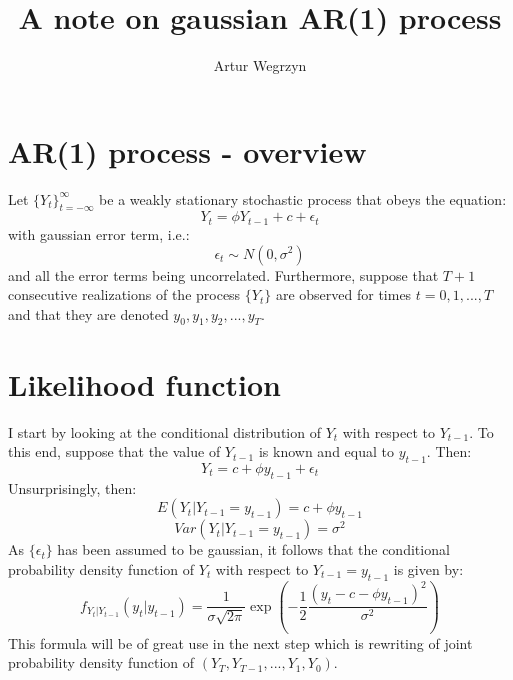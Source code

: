 \documentclass[12pt]{article}
\begin{document}
\title{A note on gaussian AR(1) process}
\author{Artur Wegrzyn}
\maketitle


\tableofcontents

\section{AR(1) process - overview}
Let $\{Y_t\}_{t=-\infty}^{\infty}$ be a weakly stationary stochastic process that obeys
the equation:
\begin{equation}
\label{ar1_def_eqtn}
Y_t = \phi Y_{t-1} + c + \epsilon_t
\end{equation}
with gaussian error term, i.e.:
\begin{equation}
\epsilon_t \sim N(0, \sigma^2)
\end{equation}
and all the error terms being uncorrelated. Furthermore, suppose that $T+1$ consecutive 
realizations of the process $\{Y_t\}$ are observed for times $t = 0, 1, ..., T$ and that
 they are denoted $y_0, y_1, y_2, ..., y_T$. \\
 

\section{Likelihood function}
I start by looking at the conditional distribution of $Y_t$ with respect to $Y_{t-1}$. 
To this end, suppose that the value of $Y_{t-1}$ is known and equal to $y_{t-1}$. Then:
\begin{equation*}
Y_t = c + \phi y_{t-1} + \epsilon_t
\end{equation*}
Unsurprisingly, then:
$$ E(Y_t | Y_{t-1} = y_{t-1}) = c + \phi y_{t-1} $$
$$Var(Y_t | Y_{t-1} = y_{t-1}) = \sigma^2 $$
As $\{\epsilon_t\}$ has been assumed to be gaussian, it follows that the conditional 
probability density function of $Y_t$ with respect to $Y_{t-1} = y_{t-1}$ is given by:
\begin{equation}
\label{ar_cond_density}
f_{Y_t | Y_{t-1}}(y_t | y_{t-1}) = \frac{1}{\sigma \sqrt{2 \pi}}
\exp \left( - \frac{1}{2} \frac{(y_t - c - \phi y_{t-1})^2}{\sigma^2} \right)
\end{equation}
This formula will be of great use in the next step which is rewriting of joint 
probability density function of $(Y_T, Y_{T-1}, ..., Y_1, Y_0)$. 
\end{document}
